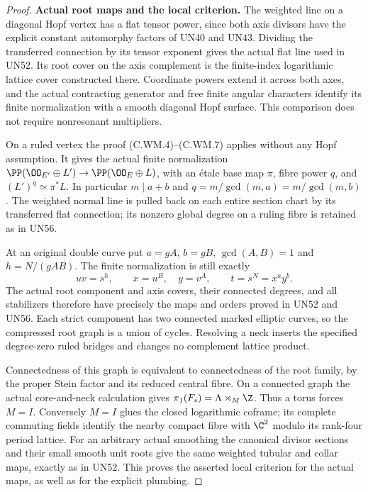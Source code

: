\begin{proof}
\par\medskip\noindent\textbf{Actual root maps and the local criterion.}
The weighted line on a diagonal Hopf vertex has a flat tensor
power, since both axis divisors have the explicit constant
automorphy factors of UN40 and UN43. Dividing the transferred
connection by its tensor exponent gives the actual flat line
used in UN52. Its root cover on the axis complement is the
finite-index logarithmic lattice cover constructed there.
Coordinate powers extend it across both axes, and the actual
contracting generator and free finite angular characters identify
its finite normalization with a smooth diagonal Hopf surface.
This comparison does not require nonresonant multipliers.

On a ruled vertex the proof (C.WM.4)--(C.WM.7) applies without
any Hopf assumption. It gives the actual finite normalization
$\PP(\OO_{E'}\oplus L')\to\PP(\OO_E\oplus L)$, with
an \'{e}tale base map $\pi$, fibre power $q$, and
$(L')^q\simeq\pi^*L$. In particular
$m\mid a+b$ and $q=m/\gcd(m,a)=m/\gcd(m,b)$.
The weighted normal line is pulled back on each entire section
chart by its transferred flat connection; its nonzero global
degree on a ruling fibre is retained as in UN56.

At an original double curve put
$a=gA$, $b=gB$, $\gcd(A,B)=1$ and
$h=N/(gAB)$. The finite normalization is still exactly
\[
             uv=s^h,\qquad x=u^B,\quad y=v^A,
             \qquad t=s^N=x^a y^b.
\tag{C.EW.1}
\]
The actual root component and axis covers, their connected
degrees, and all stabilizers therefore have precisely the
maps and orders proved in UN52 and UN56. Each strict component
has two connected marked elliptic curves, so the compressed
root graph is a union of cycles. Resolving a neck inserts the
specified degree-zero ruled bridges and changes no complement
lattice product.

Connectedness of this graph is equivalent to connectedness of
the root family, by the proper Stein factor and its reduced
central fibre. On a connected graph the actual core-and-neck
calculation gives $\pi_1(F_s)=\Lambda\rtimes_M\Z$.
Thus a torus forces $M=I$. Conversely $M=I$ glues the closed
logarithmic coframe; its complete commuting fields identify
the nearby compact fibre with $\C^2$ modulo its rank-four
period lattice. For an arbitrary actual smoothing the
canonical divisor sections and their small smooth unit roots
give the same weighted tubular and collar maps, exactly as
in UN52. This proves the asserted local criterion for the
actual maps, as well as for the explicit plumbing.


\end{proof}
